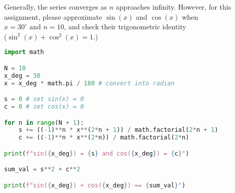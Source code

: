 \documentclass[11pt]{article}
\begin{document}
\noindent
Generally, the series converges as \(n\) approaches infinity. However, for this assignment, please approximate \(\sin(x)\) and \(\cos(x)\) when \(x=30^{\circ} \text{ and } n=10\), and check their trigonometric identity\\(\(\sin^2(x) + \cos^2(x) = 1\).)\\

\begin{lstlisting}[language=Python]
import math

N = 10
x_deg = 30
x = x_deg * math.pi / 180 # convert into radian

s = 0 # set sin(x) = 0
c = 0 # set cos(x) = 0

for n in range(N + 1):
    s += ((-1)**n * x**(2*n + 1)) / math.factorial(2*n + 1)
    c += ((-1)**n * x**(2*n)) / math.factorial(2*n)

print(f"sin({x_deg}) = {s} and cos({x_deg}) = {c}")

sum_val = s**2 + c**2

print(f"sin({x_deg}) + cos({x_deg}) == {sum_val}")

\end{lstlisting}
\end{document}
